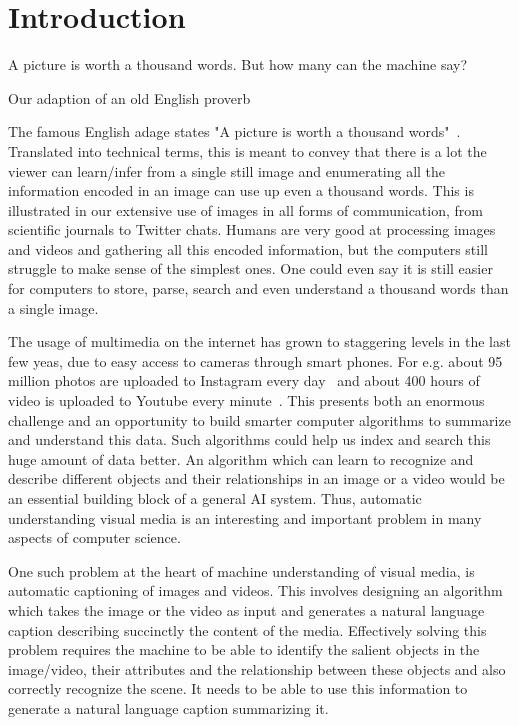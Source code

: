 \chapter{Introduction}
\label{chapter:intro}
\setlength{\epigraphwidth}{\textwidth}
\epigraph{A picture is worth a thousand words. But how many can the machine
say?}{Our adaption of an old English proverb}

The famous English adage states "A picture is worth a thousand
words"~\cite{ThousandQuote}.
Translated into technical terms, this is meant to convey that there is a lot
the viewer can learn/infer from a single still image and enumerating all the
information encoded in an image can use up even a thousand words.
This is illustrated in our extensive use of images in all forms of
communication, from scientific journals to Twitter chats. 
%
Humans are very good at processing images and videos and gathering all this
encoded information, but the computers still struggle to make sense of the
simplest ones.
%
One could even say it is still easier for computers to store, parse, search and
even understand a thousand words than a single image.
%

The usage of multimedia on the internet has grown to staggering levels in the
last few yeas, due to easy access to cameras through smart phones.
For e.g. about 95 million photos are uploaded to Instagram every
day~\cite{InstStats} and about 400 hours of video is uploaded to Youtube every
minute~\cite{YouStats}.
This presents both an enormous challenge and an opportunity to build smarter
computer algorithms to summarize and understand this data.
Such algorithms could help us index and search this huge amount of data better.
An algorithm which can learn to recognize and describe different objects and
their relationships in an image or a video would be an essential building block
of a general AI system.
Thus, automatic understanding visual media is an interesting and important
problem in many aspects of computer science.
%

One such problem at the heart of machine understanding of visual media, is
automatic captioning of images and videos.
This involves designing an algorithm which takes the image or the video as input
and generates a natural language caption describing succinctly the content of
the media.
Effectively solving this problem requires the machine to be able to identify the
salient objects in the image/video, their attributes and the relationship
between these objects and also correctly recognize the scene.
It needs to be able to use this information to generate a natural language
caption summarizing it.

